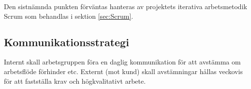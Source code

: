 \documentclass[a4paper,10pt]{article}
\begin{document}
Den sistnämnda punkten förväntas hanteras av projektets iterativa arbetsmetodik Scrum som behandlas i sektion \ref{sec:Scrum}.

\subsection{Kommunikationsstrategi}
Internt skall arbetsgruppen föra en daglig kommunikation för att avstämma om arbetsflöde förhinder etc.
Externt (mot kund) skall avstämningar hållas veckovis för att fastställa krav och högkvalitativt arbete.
\end{document}
